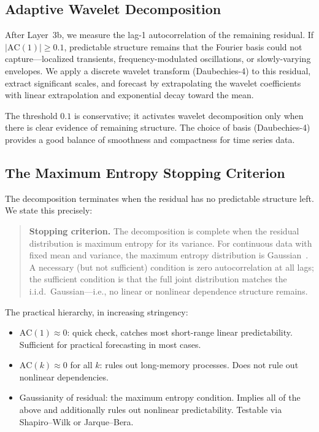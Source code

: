 \documentclass[sigconf,nonacm]{acmart}
\begin{document}
\subsection{Adaptive Wavelet Decomposition}

After Layer~3b, we measure the lag-1 autocorrelation of the remaining residual. If $|\text{AC}(1)| \geq 0.1$, predictable structure remains that the Fourier basis could not capture---localized transients, frequency-modulated oscillations, or slowly-varying envelopes. We apply a discrete wavelet transform (Daubechies-4) to this residual, extract significant scales, and forecast by extrapolating the wavelet coefficients with linear extrapolation and exponential decay toward the mean.

The threshold $0.1$ is conservative; it activates wavelet decomposition only when there is clear evidence of remaining structure. The choice of basis (Daubechies-4) provides a good balance of smoothness and compactness for time series data.

\subsection{The Maximum Entropy Stopping Criterion}

The decomposition terminates when the residual has no predictable structure left. We state this precisely:

\begin{quote}
\textbf{Stopping criterion.} The decomposition is complete when the residual distribution is maximum entropy for its variance. For continuous data with fixed mean and variance, the maximum entropy distribution is Gaussian~\cite{jaynes2003}. A necessary (but not sufficient) condition is zero autocorrelation at all lags; the sufficient condition is that the full joint distribution matches the i.i.d.\ Gaussian---i.e., no linear or nonlinear dependence structure remains.
\end{quote}

The practical hierarchy, in increasing stringency:
\begin{itemize}
\item $\text{AC}(1) \approx 0$: quick check, catches most short-range linear predictability. Sufficient for practical forecasting in most cases.
\item $\text{AC}(k) \approx 0$ for all $k$: rules out long-memory processes. Does not rule out nonlinear dependencies.
\item Gaussianity of residual: the maximum entropy condition. Implies all of the above and additionally rules out nonlinear predictability. Testable via Shapiro--Wilk or Jarque--Bera.
\end{itemize}
\end{document}
